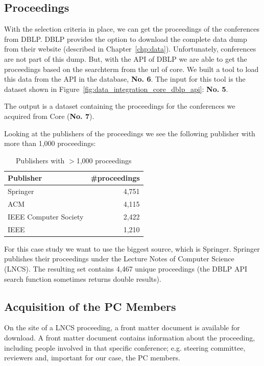 \documentclass{ou-report}
\begin{document}
\subsection{Proceedings}
With the selection criteria in place, we can get the proceedings of the 
conferences from DBLP. DBLP provides the option to download the complete data 
dump from their website (described in Chapter~\ref{chp:data}). 
Unfortunately, conferences are not part of this dump. But, with the API of DBLP
we are able to get the proceedings based on the searchterm from the url of core.
We built a tool to load this data from the API in the database, \textbf{No. 6}.
The input for this tool is the dataset shown in 
Figure~\ref{fig:data_integration_core_dblp_api}: \textbf{No. 5}.

The output is a dataset containing the proceedings for the conferences we acquired
from Core (\textbf{No. 7}).

Looking at the publishers of the proceedings we see the following publisher with 
more than 1,000 proceedings:
\begin{table}[h]
    \caption{Publishers with $>$1,000 proceedings}
    \begin{tabular}{ lr }
        \toprule
        Publisher & \#proceedings \\
        \midrule
        Springer              & 4,751 \\
        ACM                   & 4,115 \\
        IEEE Computer Society & 2,422 \\
        IEEE                  & 1,210 \\
        \bottomrule
    \end{tabular}
    \label{tbl:publisher-proceeding-count}
\end{table}
For this case study we want to use the biggest source, which is Springer. 
Springer publishes their proceedings under the Lecture 
Notes of Computer Science (LNCS). The resulting set contains 4,467 unique 
proceedings (the DBLP API search function sometimes returns double results).

\subsection{Acquisition of the PC Members}
On the site of a LNCS proceeding, a front matter document is available for
download. A front matter document contains information about the proceeding,
including people involved in that specific conference; e.g. steering committee,
reviewers and, important for our case, the PC members.
\end{document}
